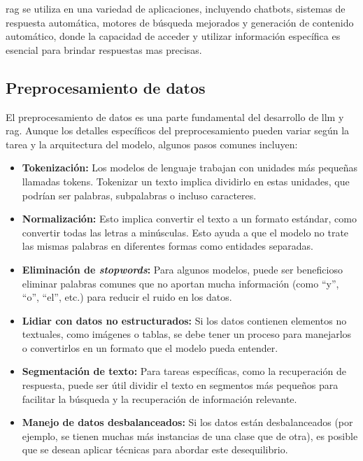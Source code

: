 
\acrshort{rag} se utiliza en una variedad de aplicaciones, incluyendo chatbots, sistemas de respuesta automática, motores de búsqueda mejorados y generación de contenido automático, donde la capacidad de acceder y utilizar información específica es esencial para brindar respuestas mas precisas.

\subsection{Preprocesamiento de datos}

El preprocesamiento de datos es una parte fundamental del desarrollo de \acrlong{llm} y \acrlong{rag}. Aunque los detalles específicos del preprocesamiento pueden variar según la tarea y la arquitectura del modelo, algunos pasos comunes incluyen:

\begin{itemize}

\item \textbf{Tokenización:} Los modelos de lenguaje trabajan con unidades más pequeñas llamadas tokens. Tokenizar un texto implica dividirlo en estas unidades, que podrían ser palabras, subpalabras o incluso caracteres.

\item \textbf{Normalización:} Esto implica convertir el texto a un formato estándar, como convertir todas las letras a minúsculas. Esto ayuda a que el modelo no trate las mismas palabras en diferentes formas como entidades separadas.
 
\item \textbf{Eliminación de \textit{stopwords}:} Para algunos modelos, puede ser beneficioso eliminar palabras comunes que no aportan mucha información (como ``y'', ``o'', ``el'', etc.) para reducir el ruido en los datos.

\item \textbf{Lidiar con datos no estructurados:} Si los datos contienen elementos no textuales, como imágenes o tablas, se debe tener un proceso para manejarlos o convertirlos en un formato que el modelo pueda entender.

\item \textbf{Segmentación de texto:} Para tareas específicas, como la recuperación de respuesta, puede ser útil dividir el texto en segmentos más pequeños para facilitar la búsqueda y la recuperación de información relevante.

\item \textbf{Manejo de datos desbalanceados:} Si los datos están desbalanceados (por ejemplo, se tienen muchas más instancias de una clase que de otra), es posible que se desean aplicar técnicas para abordar este desequilibrio.

\end{itemize}

